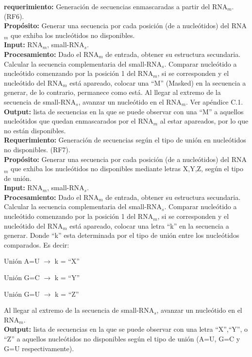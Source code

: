 \documentclass[12pt,a4paper,spanish]{article}
\begin{document}
\begin{itemize}
 		\textbf{requerimiento:} Generación de secuencias enmascaradas a partir del RNA$_m$. (RF6).\\
 	    \textbf{Propósito:} Generar una secuencia por cada posición (de a nucleótidos) del RNA$_m$ que exhiba los 								nucleótidos no disponibles. \\
		\textbf{Input:} RNA$_m$, small-RNA$_s$. \\
		\textbf{Procesamiento:} Dado el RNA$_m$ de entrada, obtener su estructura secundaria. Calcular la 									secuencia complementaria del small-RNA$_s$. Comparar nucleótido a nucleótido 									comenzando por la posición 1 del RNA$_m$, si se corresponden y el nucleótido 									del RNA$_m$ está apareado, colocar una ``M'' (Masked) en la secuencia a generar, de lo 									contrario, permanece como está. Al llegar al extremo de la secuencia de small-RNA$_s$, 									avanzar un nucleótido en el RNA$_m$. Ver apéndice C.1. \\
		\textbf{Output:} lista de secuencias en la que se puede observar con una ``M'' a aquellos nucleótidos que quedan 							 enmascarados por el RNA$_m$ al estar apareados, por lo que no están disponibles. \\

 		\textbf{Requerimiento:} Generación de secuencias según el tipo de unión en nucleótidos no disponibles. (RF7).\\
 	    \textbf{Propósito:} Generar una secuencia por cada posición (de a nucleótidos) del RNA$_m$ que exhiba los 								nucleótidos no disponibles mediante letras X,Y,Z, según el tipo de unión. \\
		\textbf{Input:} RNA$_m$, small-RNA$_s$. \\
		\textbf{Procesamiento:} Dado el RNA$_m$ de entrada, obtener su estructura secundaria. Calcular la 									secuencia complementaria del small-RNA$_s$. Comparar nucleótido a nucleótido 									comenzando por la posición 1 del RNA$_m$, si se corresponden y el nucleótido 									del RNA$_m$ está apareado, colocar una letra ``k'' en la secuencia a generar. Donde ``k'' 									esta determinada por el	tipo de unión entre los nucleótidos comparados. Es decir:  
								\par \hspace*{2.85cm} \noindent Unión A=U $\to$ k = ``X''
								\par \hspace*{2.85cm} \noindent Unión G=C $\to$ k = ``Y''
								\par \hspace*{2.85cm} \noindent Unión G=U $\to$ k = ``Z'' 
								\par Al llegar al extremo de la secuencia de small-RNA$_s$, avanzar un nucleótido en el 								RNA$_m$. \\
		\textbf{Output:} lista de secuencias en la que se puede observar con una letra ``X'',``Y'', o ``Z'' a aquellos 							 nucleótidos no disponibles según el tipo de unión (A=U, G=C y G=U respectivamente).


\end{itemize}
\end{document}

